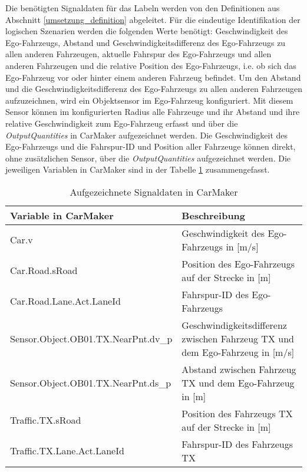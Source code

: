 Die benötigten Signaldaten für das Labeln werden von den Definitionen aus Abschnitt \ref{umsetzung_definition} abgeleitet. Für die eindeutige Identifikation der logischen Szenarien werden die folgenden Werte benötigt: Geschwindigkeit des Ego-Fahrzeugs, Abstand und Geschwindigkeitsdifferenz des Ego-Fahrzeugs zu allen anderen Fahrzeugen, aktuelle Fahrspur des Ego-Fahrzeugs und allen anderen Fahrzeugen und die relative Position des Ego-Fahrzeugs, i.e. ob sich das Ego-Fahrzeug vor oder hinter einem anderen Fahrzeug befindet. Um den Abstand und die Geschwindigkeitsdifferenz des Ego-Fahrzeugs zu allen anderen Fahrzeugen aufzuzeichnen, wird ein Objektsensor im Ego-Fahrzeug konfiguriert. Mit diesem Sensor können im konfigurierten Radius alle Fahrzeuge und ihr Abstand und ihre relative Geschwindigkeit zum Ego-Fahrzeug erfasst und über die \textit{OutputQuantities} in CarMaker aufgezeichnet werden. Die Geschwindigkeit des Ego-Fahrzeugs und die Fahrspur-ID und Position aller Fahrzeuge können direkt, ohne zusätzlichen Sensor, über die \textit{OutputQuantities} aufgezeichnet werden. Die jeweiligen Variablen in CarMaker sind in der Tabelle \ref{tab_output_quantities} zusammengefasst.

\begin{table}[h]
\centering
\def\arraystretch{1.4}
\begin{tabular}{p{7cm} p{6.8cm}}
\textbf{Variable in CarMaker} & \textbf{Beschreibung} \\
\hline

Car.v & Geschwindigkeit des Ego-Fahrzeugs in [m/s] \\
Car.Road.sRoad & Position des Ego-Fahrzeugs auf der Strecke in [m] \\
Car.Road.Lane.Act.LaneId & Fahrspur-ID des Ego-Fahrzeugs \\
\hline
Sensor.Object.OB01.TX.NearPnt.dv\_p & Geschwindigkeitsdifferenz zwischen Fahrzeug TX und dem Ego-Fahrzeug in [m/s] \\
Sensor.Object.OB01.TX.NearPnt.ds\_p & Abstand zwischen Fahrzeug TX und dem Ego-Fahrzeug in [m] \\
\hline
Traffic.TX.sRoad & Position des Fahrzeugs TX auf der Strecke in [m] \\
Traffic.TX.Lane.Act.LaneId & Fahrspur-ID des Fahrzeugs TX \\
\hline

\end{tabular}
\caption{Aufgezeichnete Signaldaten in CarMaker}
\label{tab_output_quantities}
\end{table}

